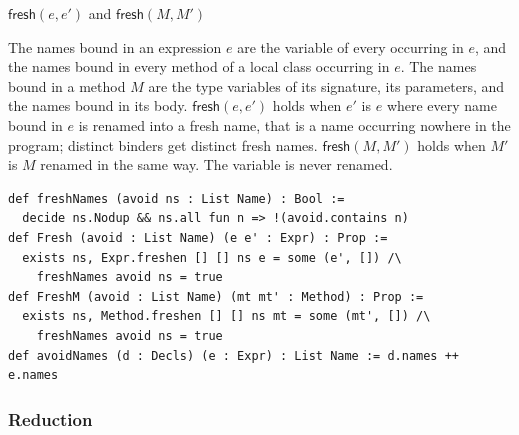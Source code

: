 \begin{cmp}{$\mathsf{fresh}(e,e')$ and $\mathsf{fresh}(M,M')$}
\begin{paperside}
The names bound in an expression $e$ are the variable of every \Q@if@ occurring in $e$, and the names bound in every method of a local class occurring in $e$.
The names bound in a method $M$ are the type variables of its signature, its parameters, and the names bound in its body.
$\mathsf{fresh}(e,e')$ holds when $e'$ is $e$ where every name bound in $e$ is renamed into a fresh name, that is a name occurring nowhere in the program; distinct binders get distinct fresh names.
$\mathsf{fresh}(M,M')$ holds when $M'$ is $M$ renamed in the same way.
The variable \Q@this@ is never renamed.
\end{paperside}
\begin{leanside}
\begin{lstlisting}[style=leanside]
def freshNames (avoid ns : List Name) : Bool :=
  decide ns.Nodup && ns.all fun n => !(avoid.contains n)
def Fresh (avoid : List Name) (e e' : Expr) : Prop :=
  exists ns, Expr.freshen [] [] ns e = some (e', []) /\
    freshNames avoid ns = true
def FreshM (avoid : List Name) (mt mt' : Method) : Prop :=
  exists ns, Method.freshen [] [] ns mt = some (mt', []) /\
    freshNames avoid ns = true
def avoidNames (d : Decls) (e : Expr) : List Name := d.names ++ e.names
\end{lstlisting}
\end{leanside}
\end{cmp}

\subsubsection{Reduction}


